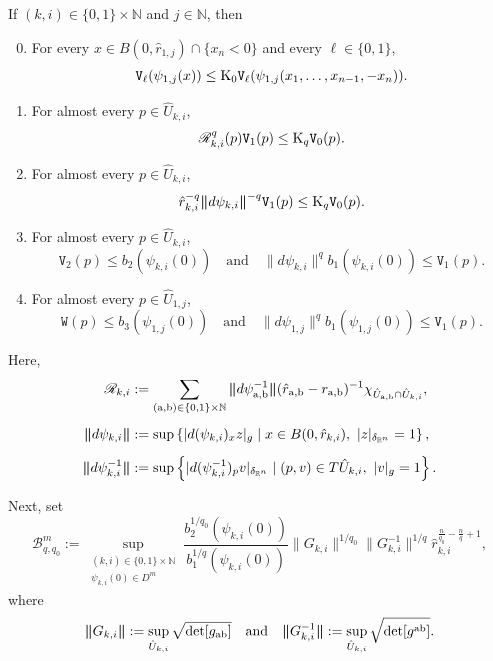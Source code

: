 \documentclass[reqno, 11pt, a4paper]{amsart}
\numberwithin{equation}{section}
\newcommand{\gij}{\textnormal{a}  \textnormal{b}}
\newcommand{\ck}{\textnormal K}
\newcommand{\wghtv}{\mathtt{V}}
\newcommand{\wghtw}{\mathtt{W}}
\newcommand{\kp}{\mathscr{R}}
\newcommand{\pvr}{p}
\newcommand{\qxp}{q}
\newcommand{\bnorm}{\boldsymbol{\|}}
\begin{document}
If $(k,i)\in\{0,1\}\times\mathbb N$ and $j\in\mathbb N$, then
\begin{enumerate}[label=($\mathtt{W}_{\arabic*}$)]

\setcounter{enumi}{-1}

 

\item \label{138}
For every $x\in B(0,\hat r_{1,j})\cap\{x_n<0\}$ and every $\ell\in\{0,1\}$,
$$
\wghtv_\ell(\psi_{1,j}(x))
\leq
\ck_0\wghtv_\ell(\psi_{1,j}(x_1,\ldots,x_{n-1},-x_n)).
$$

\item \label{45}
For almost every $\pvr\in\hat U_{k,i}$,
$$
\kp_{k,i}^{\qxp}(\pvr)\wghtv_1(\pvr)
\leq
\ck_{\qxp}\wghtv_0(\pvr).
$$


\item \label{139} For almost every $\pvr\in\hat U_{k,i}$,
$$
\hat r_{k,i}^{-\qxp}\bnorm d\psi_{k,i}\bnorm^{-\qxp}\wghtv_1(\pvr)
\leq
\ck_{\qxp}\wghtv_0(\pvr).
$$


\item \label{46}
For almost every $\pvr\in\hat U_{k,i}$,
$$
\wghtv_2(\pvr)
\leq
b_2(\psi_{k,i}(0))
\quad\text{and}\quad
\bnorm d\psi_{k,i}\bnorm^{\qxp} b_1(\psi_{k,i}(0))
\leq
\wghtv_1(\pvr).
$$

\item \label{16}
For almost every $\pvr\in\hat U_{1,j}$,
$$
\wghtw(\pvr)
\leq
b_3(\psi_{1,j}(0))
\quad\text{and}\quad
{ \bnorm d\psi_{1,j}\bnorm^{\qxp}} b_1(\psi_{1,j}(0))
\leq
\wghtv_1(\pvr).
$$
\end{enumerate}





Here,
\begin{align*}
\kp_{k,i}
&\displaystyle:=
\sum_{(\textnormal a,\textnormal b)\in\{0,1\}\times\mathbb N}
\bnorm d\psi_{\textnormal a,\textnormal b}^{-1}\bnorm
(\hat r_{\textnormal a,\textnormal b}-r_{\textnormal a,\textnormal b})^{-1}
\chi_{\hat U_{\textnormal a,\textnormal b}\cap\hat U_{k,i}},\\[5pt]
\bnorm d\psi_{k,i}\bnorm
&\displaystyle:=
\sup\left\{
|d(\psi_{k,i})_x z|_g
\mid
x\in B(0,\hat r_{k,i}),\ |z|_{\delta_{\mathbb R^n}}=1
\right\},\\[5pt]
\bnorm d\psi_{k,i}^{-1}\bnorm
&\displaystyle:=
\sup\left\{
|d(\psi_{k,i}^{-1})_{\pvr}v|_{\delta_{\mathbb R^n}}
\mid
(\pvr,v)\in T\hat U_{k,i},\ |v|_g=1
\right\}.
\end{align*}

Next, set
\begin{equation*}
\mathcal B_{\qxp,\qxp_0}^m
:=
\sup_{\substack{(k,i)\in\{0,1\}\times\mathbb N\\ \psi_{k,i}(0)\in D^m}}
\frac{b_2^{1/\qxp_0}(\psi_{k,i}(0))}{b_1^{1/\qxp}(\psi_{k,i}(0))}
\bnorm G_{k,i}\bnorm^{1/\qxp_0}
\bnorm G_{k,i}^{-1}\bnorm^{1/\qxp}
\hat r_{k,i}^{\frac n{\qxp_0}-\frac n{\qxp}+1},
\end{equation*}
where
\[
\bnorm G_{k,i}\bnorm
:=\sup_{\hat U_{k,i}}\sqrt{\det[g_{\gij}]}
\quad\text{and}\quad
\bnorm G_{k,i}^{-1}\bnorm
:=\sup_{\hat U_{k,i}}\sqrt{\det[g^{\gij}]}.
\]
\end{document}
